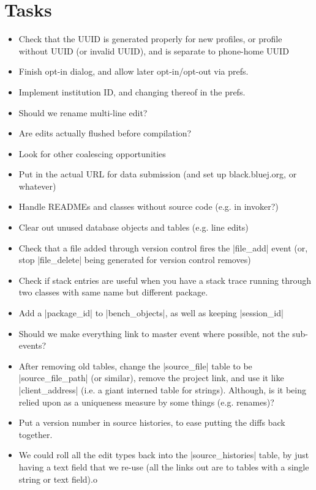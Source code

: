 \documentclass{book}
\begin{document}
\section{Tasks}

\begin{itemize}
\item Check that the UUID is generated properly for new profiles, or profile without
UUID (or invalid UUID), and is separate to phone-home UUID
\item Finish opt-in dialog, and allow later opt-in/opt-out via prefs.
\item Implement institution ID, and changing thereof in the prefs.
\item Should we rename multi-line edit?
\item Are edits actually flushed before compilation?
\item Look for other coalescing opportunities
\item Put in the actual URL for data submission (and set up black.bluej.org,
  or whatever)
\item Handle READMEs and classes without source code (e.g. in invoker?)
\item Clear out unused database objects and tables (e.g. line edits)
\item Check that a file added through version control fires the |file_add| event
  (or, stop |file_delete| being generated for version control removes)
\item Check if stack entries are useful when you have a stack trace
  running through two classes with same name but different package.
\item Add a |package_id| to |bench_objects|, as well as keeping |session_id|
\item Should we make everything link to master event where possible, not the sub-events?
\item After removing old tables, change the |source_file| table to be
  |source_file_path| (or similar), remove the project link, and use it like
  |client_address| (i.e. a giant interned table for strings).  Although, is it
  being relied upon as a uniqueness measure by some things (e.g. renames)?
\item Put a version number in source histories, to ease putting the diffs back together.
\item We could roll all the edit types back into the |source_histories| table,
  by just having a text field that we re-use (all the links out are to tables
  with a single string or text field).o
\end{itemize}
\end{document}

